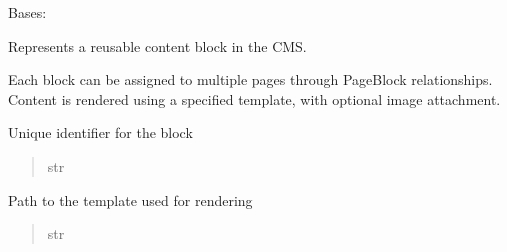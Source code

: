 \documentclass[letterpaper,10pt,english]{sphinxmanual}
\begin{document}
\begin{fulllineitems}
\label{\detokenize{pages_app.models:pages_app.models.block.Block}}
\pysigstartsignatures
\pysiglinewithargsret
{}
{\sphinxparamcomma {}}
{}
\pysigstopsignatures
\sphinxAtStartPar
Bases: {\hyperref[\detokenize{pages_app.models:pages_app.models.base.TimestampedModel}]{}}

\sphinxAtStartPar
Represents a reusable content block in the CMS.

\sphinxAtStartPar
Each block can be assigned to multiple pages through PageBlock relationships.
Content is rendered using a specified template, with optional image attachment.

\begin{fulllineitems}
\label{\detokenize{pages_app.models:pages_app.models.block.Block.name}}
\pysigstartsignatures
\pysigline
{}
\pysigstopsignatures
\sphinxAtStartPar
Unique identifier for the block
\begin{quote}\begin{description}
\sphinxAtStartPar
str

\end{description}\end{quote}

\end{fulllineitems}


\begin{fulllineitems}
\label{\detokenize{pages_app.models:pages_app.models.block.Block.template}}
\pysigstartsignatures
\pysigline
{}
\pysigstopsignatures
\sphinxAtStartPar
Path to the template used for rendering
\begin{quote}\begin{description}
\sphinxAtStartPar
str

\end{description}\end{quote}


\end{fulllineitems}
\end{fulllineitems}
\end{document}
